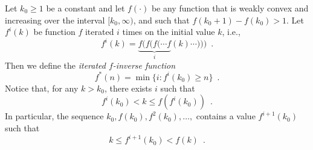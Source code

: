 \documentclass{patmorin}
\begin{document}
Let $k_0\ge 1$ be a constant and let $f(\cdot)$ be any function that is
weakly convex and increasing over the interval $[k_0,\infty)$, and such
that $f(k_0+1)-f(k_0) > 1$.  Let $f^{i}(k)$ be function $f$ iterated
$i$ times on the initial value $k$, i.e.,
\[
   f^{i}(k) = \underbrace{f(f(f(\cdots f}_{i}(k)\cdots))) \enspace .
\]
Then we define the \emph{iterated
$f$-inverse function}
\[
   f^*(n) = \min\{i : f^{i}(k_0) \ge n\} \enspace .
\] 
Notice that, for any $k> k_0$, there exists $i$ such that
\[
   f^i(k_0) < k \le f(f^i(k_0)) \enspace .
\]
In particular, the sequence $k_0,f(k_0),f^2(k_0),\ldots,$ contains
a value $f^{i+1}(k_0)$ such that
\[
      k  \le  f^{i+1}(k_0) < f(k) \enspace .
\]
%
%
%
%
\end{document}
